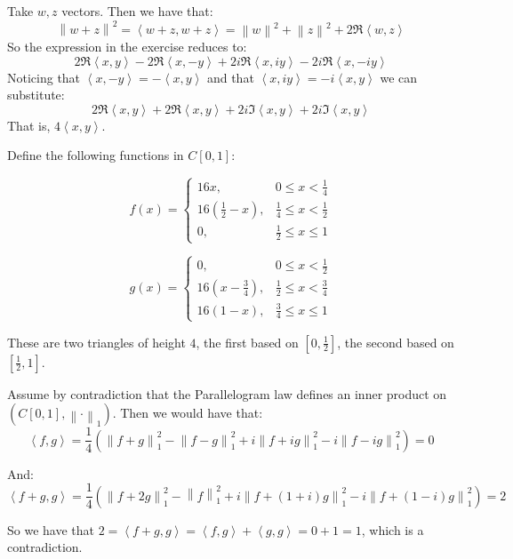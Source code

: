 \documentclass[11pt]{article} %
\newcommand{\norm}[1]{\left\lVert#1\right\rVert}
\newcommand{\inpr}[2]{\left<#1, #2\right>}
\begin{document}
\begin{Answer}
\begin{enumerate}
\begin{item}
Take $w,z$ vectors. Then we have that:
\[ \norm{w + z}^2 =  \inpr{w+z}{w+z} = \norm{w}^2 + \norm{z}^2 + 2\Re\inpr{w}{z} \]
So the expression in the exercise reduces to:
\[ 2\Re\inpr{x}{y} - 2\Re\inpr{x}{-y} + 2i\Re\inpr{x}{iy} -2i\Re\inpr{x}{-iy}\]
Noticing that $\inpr{x}{-y} = -\inpr{x}{y}$ and that $\inpr{x}{iy} = -i\inpr{x}{y}$ we can substitute:
\[ 2\Re\inpr{x}{y} + 2\Re\inpr{x}{y} + 2i\Im\inpr{x}{y} +2i\Im\inpr{x}{y} \]
That is, $4\inpr{x}{y}$.
\end{item}
\begin{item}
Define  the following functions in $C\left[0,1\right]$:

\[
f\left(x\right) = 
\begin{cases}
16x, & 0 \leq x < \frac{1}{4} \\
16\left(\frac{1}{2} - x\right), & \frac{1}{4} \leq x < \frac{1}{2} \\
0, & \frac{1}{2} \leq x \leq 1
\end{cases}
\]

\[
g\left(x\right) = 
\begin{cases}
0, & 0 \leq x < \frac{1}{2} \\
16\left(x - \frac{3}{4}\right), & \frac{1}{2} \leq x < \frac{3}{4} \\
16\left(1 - x\right), & \frac{3}{4} \leq x \leq 1
\end{cases}
\]

These are two triangles of height $4$, the first based on $\left[0,\frac{1}{2}\right]$, the second based on $\left[\frac{1}{2}, 1\right]$.

Assume by contradiction that the Parallelogram law defines an inner product on $\left(C\left[0,1\right], \norm{\cdot}_1\right)$. Then we would have that:
\[ \inpr{f}{g} = \frac{1}{4}\left(\norm{f+g}_1^2 - \norm{f-g}_1^2 + i\norm{f + ig}_1^2 - i\norm{f - ig}_1^2\right) = 0 \]

And:
\[ \inpr{f+g}{g} = \frac{1}{4}\left(\norm{f + 2g}_1^2 - \norm{f}_1^2 + i\norm{f + \left(1 + i\right)g}_1^2- i\norm{f + \left(1 - i\right)g}_1^2\right) = 2 \]

So we have that $2 = \inpr{f+g}{g} = \inpr{f}{g} + \inpr{g}{g} = 0 + 1 = 1$, which is a contradiction.

\end{item}
\end{enumerate}
\end{Answer}
\end{document}
